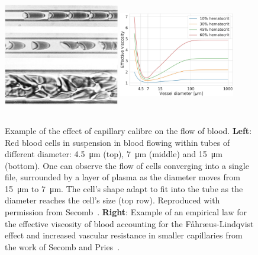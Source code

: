 \documentclass{article}
\begin{document}
\begin{figure}[t!]
  \centering
  \includegraphics[width=0.45\textwidth, height=5.3cm]{cropped-RBC-in-capillaries.jpg}
  \hfill
  \includegraphics[width=0.45\textwidth, height=5.3cm]{EffectiveViscosity-Secomb.jpeg}
  \caption{Example of the effect of capillary calibre on the flow of blood. \textbf{Left}: Red blood cells in suspension in blood flowing within tubes of different diameter: \SI{4.5}{\micro\meter} (top), \SI{7}{\micro\meter} (middle) and \SI{15}{\micro\meter} (bottom). One can observe the flow of cells converging into a single file, surrounded by a layer of plasma as the diameter moves from \SI{15}{\micro\meter} to \SI{7}{\micro\meter}. The cell's shape adapt to fit into the tube as the diameter reaches the cell's size (top row). Reproduced with permission from Secomb~\cite{Secomb_2003}. \textbf{Right}: Example of an empirical law for the effective viscosity of blood accounting for the F\r{a}hr\ae us-Lindqvist effect and increased vascular resistance in smaller capillaries from the work of Secomb and Pries~\cite{Secomb_2013}.}
  \label{fig:effectiveViscosity}
\end{figure}
\end{document}
